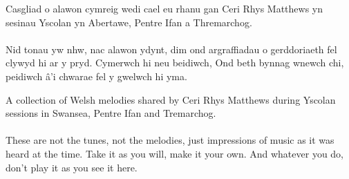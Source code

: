 \begin{multicols}{2}
  \normalsize{
    \noindent Casgliad o alawon cymreig wedi cael eu rhanu gan Ceri Rhys Matthews
    yn sesinau Yscolan yn Abertawe, Pentre Ifan a Thremarchog.
    \\
    \\
    Nid tonau yw nhw, nac alawon ydynt, dim ond argraffiadau o gerddoriaeth
    fel clywyd hi ar y pryd. Cymerwch hi neu beidiwch, Ond beth bynnag wnewch chi,
    peidiwch â'i chwarae fel y gwelwch hi yma.
  }

  \newcolumn

  \normalsize{
    \noindent A collection of Welsh melodies shared by Ceri Rhys Matthews
    during Yscolan sessions in Swansea, Pentre Ifan and Tremarchog.
    \\
    \\
    These are not the tunes, not the melodies, just impressions of music
    as it was heard at the time. Take it as you will, make it your own.
    And whatever you do, don't play it as you see it here.
  }
\end{multicols}